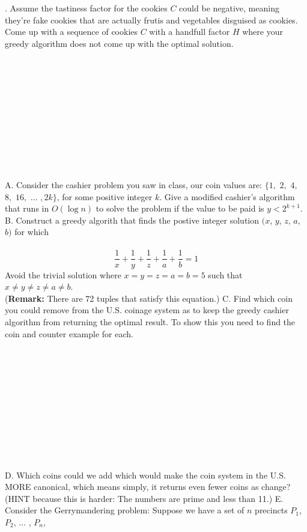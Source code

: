 \documentclass[12pt]{article}
\begin{document}
\newpage {}. Assume the tastiness factor for the cookies $C$ could be negative, meaning they're fake cookies that are actually frutis and vegetables disguised as cookies. Come up with a sequence of cookies $C$ with a handfull factor $H$ where your greedy algorithm does not come up with the optimal solution.\\\\\\\\\\\\\\\\\\\\\\\\
A. Consider the cashier problem you saw in class, our coin values are:
$\{1,$ $2,$ $4,$ $8,$ $16,$ $\dots$ $,2k\}$, for some positive integer $k$. Give a modified cashier's algorithm that runs in $O(\log{n})$
to solve the problem if the value to be paid is $y < 2^{k+1}$.
\newpage
\noindent B. Construct a greedy algorith that finds the postive integer solution $(x$, $y$, $z$, $a$, $b)$ for which\\\\
$$\frac{1}{x}+\frac{1}{y}+\frac{1}{z}+\frac{1}{a}+\frac{1}{b}=1$$
Avoid the trivial solution where $x=y=z=a=b=5$ such that $x\neq y \neq z \neq a \neq b$.\\
(\textbf{Remark:} There are 72 tuples that satisfy this equation.)
\newpage
\noindent C. Find which coin you could remove from the U.S. coinage system as to keep the greedy cashier algorithm
from returning the optimal result. To show this you need to find the coin and counter example for each.\\\\\\\\\\\\\\\\\\\\\\\\
D. Which coins could we add which would make the coin system in the U.S. MORE canonical, which means simply, it returns even fewer coins as change? (HINT because this is harder:
The numbers are prime and less than 11.)
\newpage
\noindent E. Consider the Gerrymandering problem: Suppose we have a set of $n$ precincts $P_1$, $P_2$, $\dots$ , $P_n$,
\end{document}
